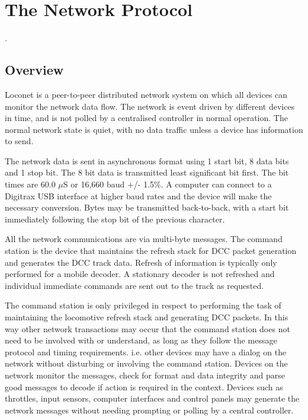  

\chapter[Network Protocol]{The Network Protocol}.  

\section{Overview}

\Gls{Loconet} is a \gls{peer-to-peer} distributed network system on which all devices can monitor the network data flow. The network is event driven by different devices in time, and is not \gls{polled} by a centralised controller in normal operation. The normal network state is quiet, with no data traffic unless a device has information to send.

The network data is sent in asynchronous format using 1 start bit, 8 data bits and 1 stop bit. The 8 bit data is transmitted least significant bit first. The bit times are 60.0 $\mu$S or 16,660 baud +/- 1.5\%. A computer can connect to a Digitrax USB interface at higher baud rates and the device will make the necessary conversion. Bytes may be transmitted back-to-back, with a start bit immediately following the stop bit of the previous character. 

All the network communications are via multi-byte messages. The \gls{command station} is the device that maintains the refresh stack for \gls{DCC} packet generation and generates the DCC track data. Refresh of information is typically only performed for a \gls{mobile decoder}. A \gls{stationary decoder} is not refreshed and individual immediate commands are sent out to the track as requested.

The command station is only privileged in respect to performing the task of maintaining the locomotive refresh stack and generating DCC packets. In this way other network transactions may occur that the command station does not need to be involved with or understand, as long as they follow the message protocol and timing requirements. i.e. other devices may have a dialog on the network without disturbing or involving the command station. Devices on the network monitor the messages, check for format and data integrity and parse good messages to decode if action is required in the context. Devices such as throttles, input sensors, computer interfaces and control panels may generate the network messages without needing prompting or \gls{polling} by a central controller.

